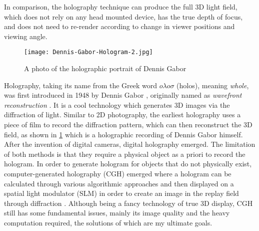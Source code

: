 In comparison, the holography technique can produce the full 3D light field, which does not rely on any head mounted device, has the true depth of focus, and does not need to re-render according to change in viewer positions and viewing angle.

\begin{figure}[H]
    \centering
    \texttt{[image: Dennis-Gabor-Hologram-2.jpg]}
    \caption{A photo of the holographic portrait of Dennis Gabor \cite{Lo2018}}\label{fig:Dennis-Gabor-Hologram-2}
\end{figure}

Holography, taking its name from the Greek word $o \lambda o \sigma $ (holos), meaning \textit{whole}, was first introduced in 1948 by Dennis Gabor \cite{Gabor1948}, originally named as \textit{wavefront reconstruction} \cite{Hecht2017}. It is a cool technology which generates 3D images via the diffraction of light. Similar to 2D photography, the earliest holography uses a piece of film to record the diffraction pattern, which can then reconstruct the 3D field, as shown in \cref{fig:Dennis-Gabor-Hologram-2} which is a holographic recording of Dennis Gabor himself. After the invention of digital cameras, digital holography emerged. The limitation of both methods is that they require a physical object as a priori to record the hologram. In order to generate hologram for objects that do not physically exist, computer-generated holography (CGH) emerged where a hologram can be calculated through various algorithmic approaches and then displayed on a spatial light modulator (SLM) in order to create an image in the replay field through diffraction \cite{Cable2006,Seldowitz1987,Yang2009,Gerchberg1972}. Although being a fancy technology of true 3D display, CGH still has some fundamental issues, mainly its image quality and the heavy computation required, the solutions of which are my ultimate goals.


